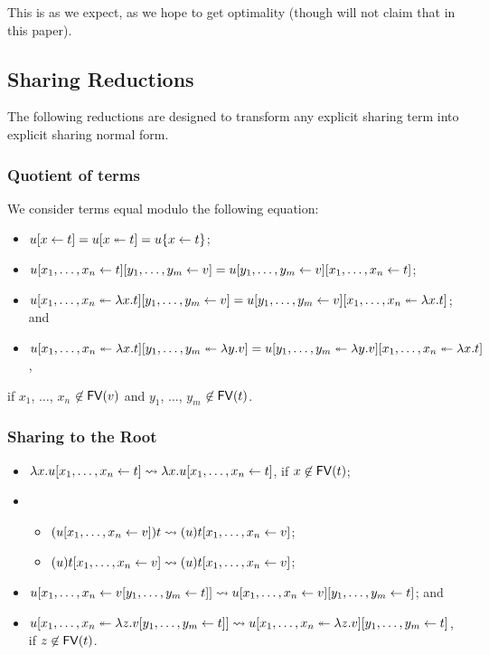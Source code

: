 \documentclass[11pt,a4paper]{article}
\theoremstyle{definition}
\theoremstyle{plain}
\theoremstyle{remark}
\begin{document}
This is as we expect, as we hope to get optimality (though will not claim that in this paper).

\subsection{Sharing Reductions}

The following reductions are designed to transform any explicit sharing term into explicit sharing normal form.

\subsubsection{Quotient of terms}

We consider terms equal modulo the following equation:

\begin{itemize}
 \item ${ {u}[{x}\leftarrow{t}] }={ {u}[{x}\twoheadleftarrow{t}] }=u\{x\leftarrow t\}$;
 \item ${ { {{ { {u}[{{x_1},\dots,{x_n}}\leftarrow{t}] } }}[{{y_1},\dots,{y_m}}\leftarrow{v}] } }={ { {{ { {u}[{{y_1},\dots,{y_m}}\leftarrow{v}] } }}[{{x_1},\dots,{x_n}}\leftarrow{t}] } }$;
 \item ${ { {{ { {u}[{{x_1},\dots,{x_n}}\twoheadleftarrow{\lambda{x}.{t}}] } }}[{{y_1},\dots,{y_m}}\leftarrow{v}] } }={ { {{ { {u}[{{y_1},\dots,{y_m}}\leftarrow{v}] } }}[{{x_1},\dots,{x_n}}\twoheadleftarrow{\lambda{x}.{t}}] } }$; and
 \item ${ { {{ { {u}[{{x_1},\dots,{x_n}}\twoheadleftarrow{\lambda{x}.{t}}] } }}[{{y_1},\dots,{y_m}}\twoheadleftarrow{\lambda{y}.{v}}] } }={ { {{ { {u}[{{y_1},\dots,{y_m}}\twoheadleftarrow{\lambda{y}.{v}}] } }}[{{x_1},\dots,{x_n}}\twoheadleftarrow{\lambda{x}.{t}}] } }$,
\end{itemize}
if $x_1$, $\dots$, $x_n$ $\not\in{\mathop{\mathsf{FV}}}(v)$ and $y_1$, $\dots$, $y_m$ $\not\in{\mathop{\mathsf{FV}}}(t)$.

\subsubsection{Sharing to the Root}

\begin{itemize}
 \item $\lambda x.{ { {u}[{{x_1},\dots,{x_n}}\leftarrow{t}] } }\rightsquigarrow{  { {\lambda x.u}[{{x_1},\dots,{x_n}}\leftarrow{t}] }  }$, if $x\not\in{\mathop{\mathsf{FV}}}(t)$;
 \item \begin{itemize}
        \item $({ { {u}[{{x_1},\dots,{x_n}}\leftarrow{v}] } })t\rightsquigarrow{  { {(u)t}[{{x_1},\dots,{x_n}}\leftarrow{v}] }  }$;
        \item $(u){ { {t}[{{x_1},\dots,{x_n}}\leftarrow{v}] } }\rightsquigarrow{  { {(u)t}[{{x_1},\dots,{x_n}}\leftarrow{v}] }  }$;
       \end{itemize}
 \item ${ { {u}[{{x_1},\dots,{x_n}}\leftarrow{ {  { {v}[{{y_1},\dots,{y_m}}\leftarrow{t}] }  } }] } }\rightsquigarrow{  { { {  { {u}[{{x_1},\dots,{x_n}}\leftarrow{v}] }  } }[{{y_1},\dots,{y_m}}\leftarrow{t}] }  }$; and
 \item ${ { {u}[{{x_1},\dots,{x_n}}\twoheadleftarrow{\lambda{z}.{ {  { {v}[{{y_1},\dots,{y_m}}\leftarrow{t}] }  } }}] } }\rightsquigarrow{  { { {  { {u}[{{x_1},\dots,{x_n}}\twoheadleftarrow{\lambda{z}.{v}}] }  } }[{{y_1},\dots,{y_m}}\leftarrow{t}] }  }$, if $z\not\in{\mathop{\mathsf{FV}}}(t)$.
\end{itemize}
\end{document}
